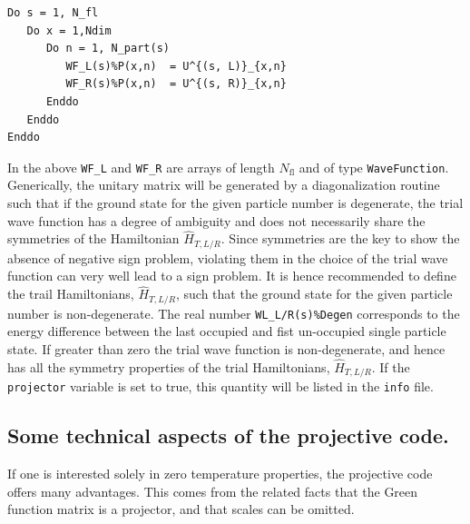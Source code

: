 \begin{lstlisting}[style=fortran]
Do s = 1, N_fl
   Do x = 1,Ndim
      Do n = 1, N_part(s)
         WF_L(s)%P(x,n)  = U^{(s, L)}_{x,n}
         WF_R(s)%P(x,n)  = U^{(s, R)}_{x,n}
      Enddo
   Enddo
Enddo
\end{lstlisting}
In the above    \texttt{WF\_L}  and \texttt{WF\_R}  are arrays  of length $N_{\mathrm{fl}}$ and of type \texttt{WaveFunction}.   Generically,   the  unitary matrix    will  be generated by a
diagonalization routine such that  if the ground state for the given particle number is degenerate, the trial wave function  has a degree of ambiguity  and does not necessarily share the symmetries of the Hamiltonian $\hat{H}_{T, L/R}$.   Since symmetries are  the key to show the absence of negative sign problem,   violating them in the choice of the trial wave function can very well lead to a  sign problem.   It is hence recommended to define the  trail Hamiltonians,  $\hat{H}_{T, L/R}$, such that the ground state  for the given  particle number is non-degenerate. The  real number   \texttt{WL\_L/R(s)\%Degen}   corresponds to the energy difference between the last occupied and fist un-occupied single particle state.  If greater than zero  the trial wave function is non-degenerate, and hence has all the symmetry properties of the trial Hamiltonians, $\hat{H}_{T, L/R}$.    If the \texttt{projector}   variable is set to true, this quantity will be listed in the 
\texttt{info}   file. 

\subsection{Some technical aspects of the projective code.}
If one is interested solely in zero temperature properties, the projective code offers many advantages.   This comes from the related facts that the Green function matrix is a projector, and that scales can be omitted. 
  

